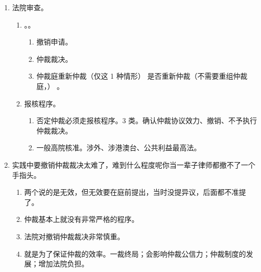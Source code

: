 \begin{enumerate}
\begin{enumerate}
\begin{enumerate}
\begin{enumerate}
                        \end{enumerate}
                  \item {}。
                \end{enumerate}
          \item 法院审查。
                \begin{enumerate}
                  \item {}。。
                        \begin{enumerate}
                          \item {}撤销申请。
                          \item {}仲裁裁决。
                          \item {}仲裁庭重新仲裁（仅这 1 种情形） \yjt
                                是否重新仲裁（不需要重组仲裁庭，） \yjt
                                 \yjt
                                。
                        \end{enumerate}
                  \item 报核程序。
                        \begin{enumerate}
                          \item 否定仲裁必须走报核程序。3 类。确认仲裁协议效力、撤销、不予执行仲裁裁决。
                          \item 一般高院核准。涉外、涉港澳台、公共利益最高法。
                        \end{enumerate}
                \end{enumerate}
          \item 实践中要撤销仲裁裁决太难了，难到什么程度呢你当一辈子律师都撤不了一个手指头。
                \begin{enumerate}
                  \item \xjt 两个说的是无效，但无效要在庭前提出，当时没提异议，后面都不准提了。
                  \item 仲裁基本上就没有非常严格的程序。
                  \item 法院对撤销仲裁裁决非常慎重。
                  \item 就是为了保证仲裁的效率。一裁终局；会影响仲裁公信力；仲裁制度的发展；增加法院负担。
                \end{enumerate}
        \end{enumerate}
\end{enumerate}
